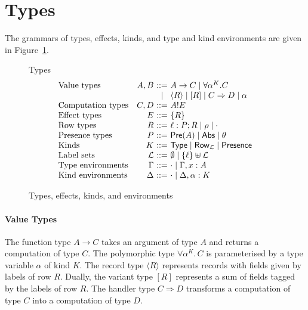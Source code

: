 \documentclass[mscres,cdtppar,twoside,openright,logo,rightchapter,normalheadings]{infthesis}
\makeatletter
\theoremstyle{definition}
\newcommand{\slab}[1]{\textrm{#1}}
\newcommand{\Record}[1]{\ensuremath{\langle #1 \rangle}}
\newcommand{\Pre}[1]{\mathsf{Pre}(#1)}
\newcommand{\Abs}{\mathsf{Abs}}
\newcommand{\Presence}{\mathsf{Presence}}
\newcommand{\Row}{\mathsf{Row}}
\newcommand{\Type}{\mathsf{Type}}
\newcommand{\Int}{\mathsf{Int}}
\newcommand{\Bool}{\mathsf{Bool}}
\newcommand{\eff}{!}
\newcommand{\Harrow}[4]{#1!#2 \Rightarrow #3!#4}
\newcommand{\ba}{\begin{array}}
\newcommand{\ea}{\end{array}}
\newenvironment{syntax}{\[\ba{@{}l@{\quad}r@{~}c@{~}l@{}}}{\ea\]\ignorespacesafterend}
\makeatother
\begin{document}
\section{Types}
The grammars of types, effects, kinds, and type and kind environments
are given in Figure~\ref{fig:types-syntax}.

\begin{figure}
Types
\begin{syntax}
\slab{Value types}    &A,B  &::= & %
                                      A \to C
                               \mid  \forall \alpha^K.C \\
                             &&\mid& \Record{R} \mid [R]
                               \mid  C \Rightarrow D \mid \alpha \\
\slab{Computation types} 
                      &C,D  &::= & A \eff E \\
\slab{Effect types}   &E    &::= & \{R\}\\
\slab{Row types}      &R    &::= & \ell : P;R \mid \rho \mid \cdot \\
\slab{Presence types} &P    &::= & \Pre{A} \mid \Abs \mid \theta\\
\slab{Kinds}          &K    &::= & \Type \mid \Row_\mathcal{L} \mid \Presence\\
\slab{Label sets}     &\mathcal{L} &::=& \emptyset \mid \{\ell\} \uplus \mathcal{L}\\
\slab{Type environments} &\Gamma &::=& \cdot \mid \Gamma, x:A \\
\slab{Kind environments} &\Delta &::=& \cdot \mid \Delta, \alpha:K \\
\end{syntax}
\caption{Types, effects, kinds, and environments}
\label{fig:types-syntax}
\end{figure}

\paragraph{Value Types}
The function type $A \to C$ takes an argument of type $A$ and returns
a computation of type $C$.
The polymorphic type $\forall \alpha^K .\, C$ is parameterised by a
type variable $\alpha$ of kind $K$. The record type $\Record{R}$
represents records with fields given by labels of row $R$. Dually, the
variant type $[R]$ represents a sum of fields tagged by the labels of
row $R$. The handler type $C \Rightarrow D$ transforms a computation
of type $C$ into a computation of type $D$.
\end{document}

